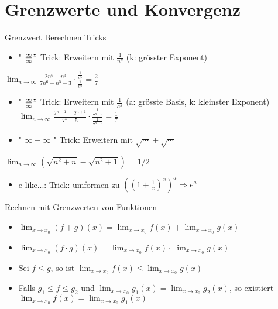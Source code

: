 \section{Grenzwerte und Konvergenz}



\begin{KR}{Grenzwert Berechnen Tricks}
    \begin{itemize}
      \item " $\frac{\infty}{\infty} "$ Trick: Erweitern mit $\frac{1}{n^{k}}$ (k: grösster Exponent)
    \end{itemize}
    
    $\lim _{n \rightarrow \infty} \frac{2 n^{6}-n^{3}}{7 n^{6}+n^{5}-3} \cdot \frac{\frac{1}{n^{6}}}{\frac{1}{n^{6}}}=\frac{2}{7}$
    
    \begin{itemize}
      \item " $\frac{\infty}{\infty} "$ Trick: Erweitern mit $\frac{1}{a^{k}}$ (a: grösste Basis, k: kleinster Exponent) $\lim _{n \rightarrow \infty} \frac{7^{n-1}+2^{n+1}}{7^{n}+5} \cdot \frac{\frac{1}{7^{n-1}}}{\frac{1}{7^{n-1}}}=\frac{1}{7}$
      \item " $\infty-\infty$ " Trick: Erweitern mit $\sqrt{\cdots}+\sqrt{\cdots}$
    \end{itemize}
    
    $\lim _{n \rightarrow \infty}\left(\sqrt{n^{2}+n}-\sqrt{n^{2}+1}\right)=1 / 2$
    
    \begin{itemize}
      \item e-like...: Trick: umformen zu $\left(\left(1+\frac{1}{x}\right)^{x}\right)^{a} \Rightarrow e^{a}$
    \end{itemize}
    \end{KR}

    \begin{concept}{Rechnen mit Grenzwerten von Funktionen}
        \begin{itemize}
            \item $\lim_{x \to x_0} (f + g)(x) = \lim_{x \to x_0} f(x) + \lim_{x \to x_0} g(x)$
            \item $\lim_{x \to x_0} (f \cdot g)(x) = \lim_{x \to x_0} f(x) \cdot \lim_{x \to x_0} g(x)$
            \item Sei $f \leq g$, so ist $\lim_{x \to x_0} f(x) \leq \lim_{x \to x_0} g(x)$
            \item Falls $g_1 \leq f \leq g_2$ und $\lim_{x \to x_0} g_1(x) = \lim_{x \to x_0} g_2(x)$, so existiert $\lim_{x \to x_0} f(x) = \lim_{x \to x_0} g_1(x)$
        \end{itemize}
    \end{concept}

